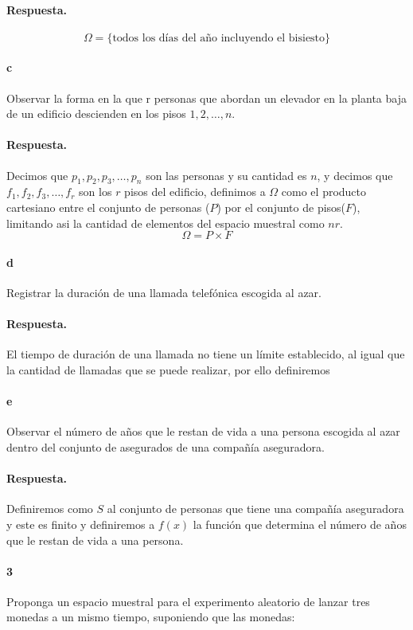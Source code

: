 \documentclass{article}
\begin{document}
\paragraph{Respuesta.}
$$\Omega = \{ \text{todos los días del año incluyendo el bisiesto}\}$$
\paragraph{c} Observar la forma en la que r personas que abordan un elevador en la planta baja de un edificio descienden en los pisos $1, 2, \dots, n$.
\paragraph{Respuesta.} Decimos que $p_1, p_2, p_3, \dots, p_n$ son las personas y su cantidad es $n$, y decimos que $f_1, f_2, f_3, \dots, f_r$ son los $r$ pisos del edificio, definimos a $\Omega$ como el producto cartesiano entre el conjunto de personas ($P$) por el conjunto de pisos($F$), limitando asi la cantidad de elementos del espacio muestral como $nr$.
$$\Omega = P \times F$$
\paragraph{d} Registrar la duración de una llamada telefónica escogida al azar.
\paragraph{Respuesta.} El tiempo de duración de una llamada no tiene un límite establecido, al igual que la cantidad de llamadas que se puede realizar, por ello definiremos
\paragraph{e} Observar el número de años que le restan de vida a una persona escogida al azar dentro del conjunto de asegurados de una compañía aseguradora.
\paragraph{Respuesta.} Definiremos como $S$ al conjunto de personas que tiene una compañía aseguradora y este es finito y definiremos a $f(x)$ la función que determina el número de años que le restan de vida a una persona.

\paragraph{3} Proponga un espacio muestral para el experimento aleatorio de lanzar tres monedas a un mismo tiempo, suponiendo que las monedas:
\end{document}
